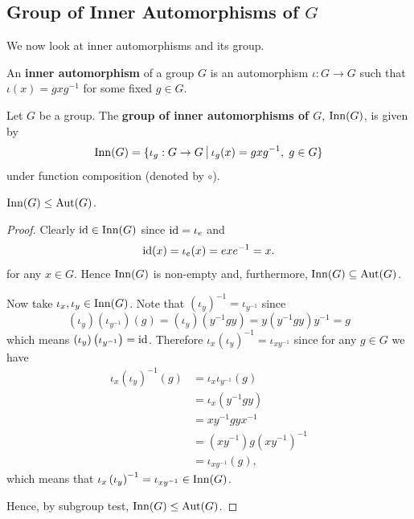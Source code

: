 \newpage

\subsection{Group of Inner Automorphisms of \texorpdfstring{$G$}{G}}
We now look at inner automorphisms and its group.
\begin{definition}
    An \textbf{inner automorphism} of a group $G$ is an automorphism $\iota: G \to G$ such that $\iota(x) = gxg^{-1}$ for some fixed $g \in G$.
\end{definition}
\begin{definition}
    Let $G$ be a group. The \textbf{group of inner automorphisms of $G$}, $\mathrm{Inn}(G)$, is given by
    \[
        \Inn{G} = \{\iota_g: G \to G \vert \iota_g(x) = gxg^{-1},\; g \in G\}
    \]
    under function composition (denoted by $\circ$).
\end{definition}

\begin{proposition}
    $\mathrm{Inn}(G) \leq \mathrm{Aut}(G)$.
\end{proposition}
\begin{proof}
    Clearly $\mathrm{id} \in \mathrm{Inn}(G)$ since $\mathrm{id} = \iota_e$ and 
    \[
        \mathrm{id}(x) = \iota_e(x) = exe^{-1} = x.
    \]
    for any $x \in G$. Hence $\mathrm{Inn}(G)$ is non-empty and, furthermore, $\mathrm{Inn}(G) \subseteq \mathrm{Aut}(G)$.

    Now take $\iota_x, \iota_y \in \mathrm{Inn}(G)$. Note that $\left(\iota_y\right)^{-1} = \iota_{y^{-1}}$ since
    \[
        \left(\iota_y\right)\left(\iota_{y^{-1}}\right)(g) = \left(\iota_y\right)\left(y^{-1}gy\right) = y\left(y^{-1}gy\right)y^{-1} = g
    \]
    which means $\left(\iota_y\right)\left(\iota_{y^{-1}}\right) = \mathrm{id}$. Therefore $\iota_x\left(\iota_y\right)^{-1} = \iota_{xy^{-1}}$ since for any $g \in G$ we have
    \begin{align*}
        \iota_x\left(\iota_y\right)^{-1}(g) &= \iota_x\iota_{y^{-1}}(g)\\
        &= \iota_x\left(y^{-1}gy\right)\\
        &= xy^{-1}gyx^{-1}\\
        &= \left(xy^{-1}\right) g \left(xy^{-1}\right)^{-1}\\
        &= \iota_{xy^{-1}}(g),
    \end{align*}
    which means that $\iota_x\left(\iota_y\right)^{-1} = \iota_{xy^{-1}} \in \mathrm{Inn}(G)$.

    Hence, by subgroup test, $\mathrm{Inn}(G) \leq \mathrm{Aut}(G)$.
\end{proof}


